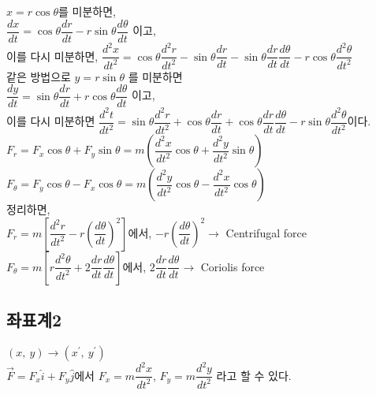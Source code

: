$ x = r \cos \theta $를 미분하면, \\
$\dfrac{dx}{dt} = \cos \theta \dfrac{dr}{dt} - r \sin \theta \dfrac{d\theta}{dt}$ 이고, \\
이를 다시 미분하면, 
$\dfrac{d^{2}x}{dt^{2}} = \cos \theta \dfrac{d^{2}r}{dt^{2}} - \sin \theta \dfrac{dr}{dt} - \sin \theta \dfrac{dr}{dt} \dfrac{d\theta}{dt} -r \cos \theta \dfrac{d^{2}\theta}{dt^{2}}$\\
같은 방법으로 $ y = r \sin \theta $ 를 미분하면 \\
$\dfrac{dy}{dt} = \sin \theta \dfrac{dr}{dt} + r \cos \theta \dfrac{d\theta}{dt}$ 이고,\\
이를 다시 미분하면
$\dfrac{d^{2}t}{dt^{2}} = \sin \theta \dfrac{d^{2}r}{dt^{2}} + \cos \theta \dfrac{dr}{dt} + \cos \theta \dfrac{dr}{dt} \dfrac{d\theta}{dt} -r \sin \theta \dfrac{d^{2}\theta}{dt^{2}}$이다. \\



$ F_{r} = F_{x} \cos \theta + F_{y} \sin \theta 
= m \left ( \dfrac{d^{2}x}{dt^{2}} \cos \theta + \dfrac{d^{2}y}{dt^{2}} \sin \theta \right) $\\

$ F_{\theta} = F_{y} \cos \theta - F_{x} \cos \theta 
= m \left ( \dfrac{d^{2}y}{dt^{2}} \cos \theta - \dfrac{d^{2}x}{dt^{2}} \cos \theta \right) $\\


정리하면, \\

$ F_{r} = m \left[ \dfrac{d^{2}r}{dt^{2}} - r \left( {\dfrac{d \theta}{dt}} \right)^{2} \right] $에서, 
$ -r \left( {\dfrac{d \theta}{dt}} \right)^{2} \rightarrow $ Centrifugal force \\

$ F_{\theta} = m \left[ r \dfrac{d^{2}\theta}{dt^{2}} + 2 \dfrac{dr}{dt} \dfrac{d\theta}{dt}  \right] $에서, 
$ 2 \dfrac{dr}{dt} \dfrac{d\theta}{dt} \rightarrow $ Coriolis force \\


\subsection{좌표계2}

$ (x,~y) 	\rightarrow (x^{\prime},~y^{\prime})$\\

$ \overrightarrow {F} = F_{x} \hat{i}  + F_{y} \hat{j} $에서 
$ F_{x} = m \dfrac{d^{2}x}{dt^{2}}$, 
$ F_{y} = m \dfrac{d^{2}y}{dt^{2}}$ 라고 할 수 있다.\\

